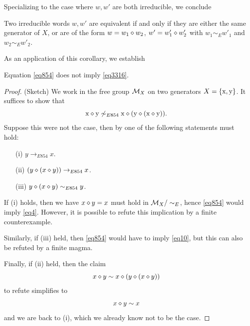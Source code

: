 Specializing to the case where $w,w'$ are both irreducible, we conclude

\begin{corollary}\label{unique factorization}  Two irreducible words $w, w'$ are equivalent if and only if they are either the same generator of $X$, or are of the form $w = w_1 \diamond w_2$, $w' = w'_1 \diamond w'_2$ with $w_1 \sim_E w'_1$ and $w_2 \sim_E w'_2$.
\end{corollary}

As an application of this corollary, we establish

\begin{proposition}\label{854-3316} Equation \eqref{eq854} does not imply \eqref{eq3316}.
\end{proposition}

\begin{proof}(Sketch)
  We work in the free group ${\mathcal{M}}_X$ on two generators $X = \{\mathrm{x},\mathrm{y}\}$.  It suffices to show that
$$  \mathrm{x} \diamond \mathrm{y} \not \sim_{E854} \mathrm{x} \diamond (\mathrm{y} \diamond (\mathrm{x} \diamond \mathrm{y})).$$
Suppose this were not the case, then by  one of the following statements must hold:
\begin{itemize}
\item[(i)] $y \to_{E854} x$.
\item[(ii)] $(y \diamond (x \diamond y)) \to_{E854} x$.
\item[(iii)] $y \diamond (x \diamond y) \sim_{E854} y$.
\end{itemize}
If (i) holds, then we have $x \diamond y = x$ must hold in ${\mathcal{M}}_X/\sim_E$, hence \eqref{eq854} would imply \eqref{eq4}.  However, it is possible to refute this implication by a finite counterexample.

Similarly, if (iii) held, then \eqref{eq854} would have to imply \eqref{eq10}, but this can also be refuted by a finite magma.

Finally, if (ii) held, then the claim
$$  x \diamond y \sim x \diamond (y \diamond (x \diamond y))$$
to refute simplifies to
$$  x \diamond y \sim x$$
and we are back to (i), which we already know not to be the case.
\end{proof}
